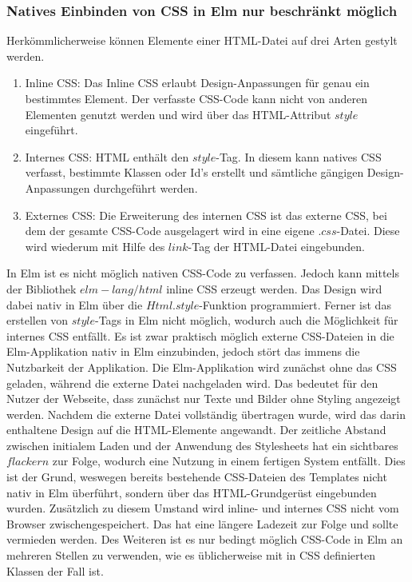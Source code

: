 \subsubsection{Natives Einbinden von CSS in Elm nur beschränkt möglich}
Herkömmlicherweise können Elemente einer \ac{HTML}-Datei auf drei Arten gestylt werden.
\begin{enumerate}
\item{Inline \ac{CSS}:}
	\subitem Das Inline \ac{CSS} erlaubt Design-Anpassungen für genau ein bestimmtes Element. Der verfasste \ac{CSS}-Code kann nicht von anderen Elementen genutzt werden und wird über das \ac{HTML}-Attribut $style$ eingeführt.
\item{Internes \ac{CSS}:}
	\subitem \ac{HTML} enthält den $style$-Tag. In diesem kann natives \ac{CSS} verfasst, bestimmte Klassen oder Id's erstellt und sämtliche gängigen Design-Anpassungen durchgeführt werden.
\item{Externes \ac{CSS}:}
	\subitem Die Erweiterung des internen \ac{CSS} ist das externe \ac{CSS}, bei dem der gesamte \ac{CSS}-Code ausgelagert wird in eine eigene $.css$-Datei. Diese wird wiederum mit Hilfe des $link$-Tag der \ac{HTML}-Datei eingebunden.
\end{enumerate}
In Elm ist es nicht möglich nativen \ac{CSS}-Code zu verfassen. Jedoch kann mittels der Bibliothek $elm-lang/html$ inline \ac{CSS} erzeugt werden. Das Design wird dabei nativ in Elm über die $Html.style$-Funktion programmiert. Ferner ist das erstellen von $style$-Tags in Elm nicht möglich, wodurch auch die Möglichkeit für internes \ac{CSS} entfällt. Es ist zwar praktisch möglich externe \ac{CSS}-Dateien in die Elm-Applikation nativ in Elm einzubinden, jedoch stört das immens die Nutzbarkeit der Applikation. Die Elm-Applikation wird zunächst ohne das \ac{CSS} geladen, während die externe Datei nachgeladen wird. Das bedeutet für den Nutzer der Webseite, dass zunächst nur Texte und Bilder ohne Styling angezeigt werden. Nachdem die externe Datei vollständig übertragen wurde, wird das darin enthaltene Design auf die \ac{HTML}-Elemente angewandt. Der zeitliche Abstand zwischen initialem Laden und der Anwendung des Stylesheets hat ein sichtbares $flackern$ zur Folge, wodurch eine Nutzung in einem fertigen System entfällt. Dies ist der Grund, weswegen bereits bestehende \ac{CSS}-Dateien des Templates nicht nativ in Elm überführt, sondern über das \ac{HTML}-Grundgerüst eingebunden wurden. Zusätzlich zu diesem Umstand wird inline- und internes \ac{CSS} nicht vom Browser zwischengespeichert. Das hat eine längere Ladezeit zur Folge und sollte vermieden werden. Des Weiteren ist es nur bedingt möglich \ac{CSS}-Code in Elm an mehreren Stellen zu verwenden, wie es üblicherweise mit in \ac{CSS} definierten Klassen der Fall ist.


